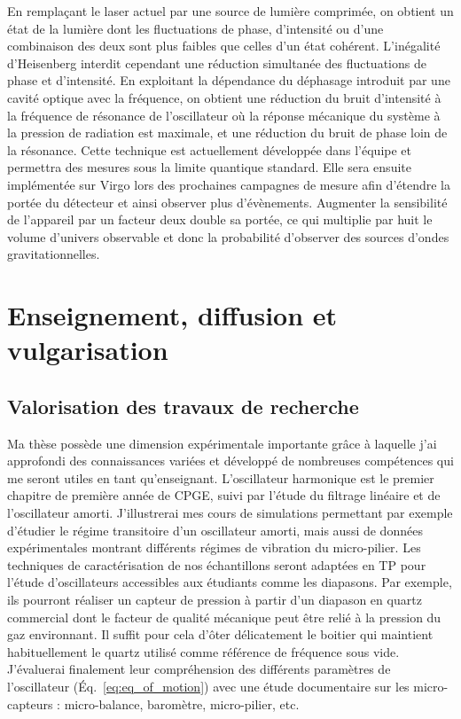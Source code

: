\documentclass[12pt,a4paper]{article}
\begin{document}
En remplaçant le laser actuel par une source de lumière comprimée, on obtient un état de la lumière dont les fluctuations de phase, d'intensité ou d'une combinaison des deux sont plus faibles que celles d'un état cohérent.
L'inégalité d'Heisenberg interdit cependant une réduction simultanée des fluctuations de phase et d'intensité.
En exploitant la dépendance du déphasage introduit par une cavité optique avec la fréquence, on obtient une réduction du bruit d'intensité à la fréquence de résonance de l'oscillateur où la réponse mécanique du système à la pression de radiation est maximale,  et une réduction du bruit de phase loin de la résonance.
Cette technique est actuellement développée dans l'équipe et permettra des mesures sous la limite quantique standard.
Elle sera ensuite implémentée sur Virgo lors des prochaines campagnes de mesure afin d'étendre la portée du détecteur et ainsi observer plus d'évènements.
Augmenter la sensibilité de l'appareil par un facteur deux double sa portée, ce qui multiplie par huit le volume d'univers observable et donc la probabilité d'observer des sources d'ondes gravitationnelles.

\section{Enseignement, diffusion et vulgarisation}

\subsection{Valorisation des travaux de recherche}

Ma thèse possède une dimension expérimentale importante grâce à laquelle j'ai approfondi des connaissances variées et développé de nombreuses compétences qui me seront utiles en tant qu'enseignant.
L'oscillateur harmonique est le premier chapitre de première année de CPGE, suivi par l'étude du filtrage linéaire et de l'oscillateur amorti.
J'illustrerai mes cours de simulations permettant par exemple d'étudier le régime transitoire d'un oscillateur amorti, mais aussi de données expérimentales montrant différents régimes de vibration du micro-pilier.
Les techniques de caractérisation de nos échantillons seront adaptées en TP pour l'étude d'oscillateurs accessibles aux étudiants comme les diapasons.
Par exemple, ils pourront réaliser un capteur de pression à partir d'un diapason en quartz commercial dont le facteur de qualité mécanique peut être relié à la pression du gaz environnant.
Il suffit pour cela d'ôter délicatement le boitier qui maintient habituellement le quartz utilisé comme référence de fréquence sous vide.
J'évaluerai finalement leur compréhension des différents paramètres de l'oscillateur (\'Eq.~\eqref{eq:eq_of_motion}) avec une étude documentaire sur les micro-capteurs : micro-balance, baromètre, micro-pilier, etc.
\end{document}
